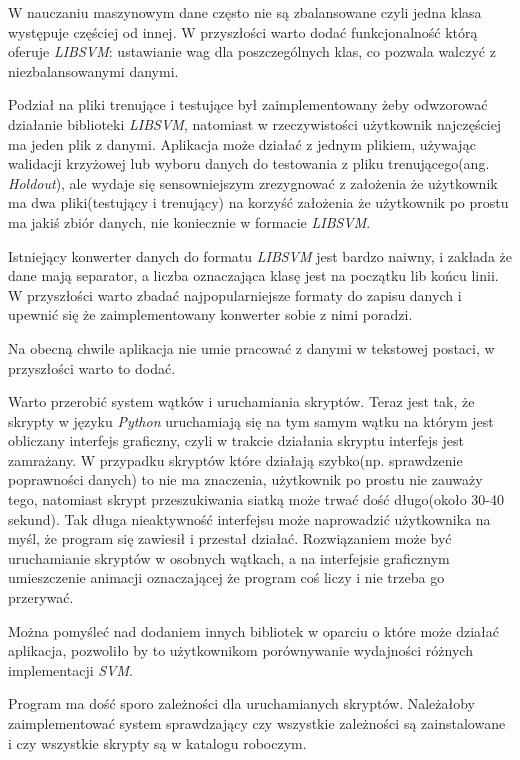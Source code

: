 \documentclass[paper=a4, fontsize=11pt]{scrartcl} %
\numberwithin{equation}{section} %
\numberwithin{figure}{section} %
\begin{document}
    \par W nauczaniu maszynowym dane często nie są zbalansowane czyli jedna klasa występuje
    częściej od innej. W przyszłości warto dodać funkcjonalność którą oferuje \textit{LIBSVM}:
    ustawianie wag dla poszczególnych klas, co pozwala walczyć z niezbalansowanymi danymi. 

    \par Podział na pliki trenujące i testujące był zaimplementowany żeby odwzorować działanie
    biblioteki \textit{LIBSVM}, natomiast w rzeczywistości użytkownik najczęściej ma jeden
    plik z danymi. Aplikacja może działać z jednym plikiem, używając walidacji krzyżowej lub
    wyboru danych do testowania z pliku trenującego(ang. \textit{Holdout}), ale wydaje się
    sensowniejszym zrezygnować z założenia że użytkownik ma dwa pliki(testujący i trenujący) na
    korzyść założenia że użytkownik po prostu ma jakiś zbiór danych, nie koniecznie w formacie
    \textit{LIBSVM}.

    \par Istniejący konwerter danych do formatu \textit{LIBSVM} jest bardzo naiwny, i zakłada
    że dane mają separator, a liczba oznaczająca klasę jest na początku lib końcu linii. W
    przyszłości warto zbadać najpopularniejsze formaty do zapisu danych i upewnić się że
    zaimplementowany konwerter sobie z nimi poradzi.

    \par Na obecną chwile aplikacja nie umie pracować z danymi w tekstowej postaci, w
    przyszłości warto to dodać. 

    \par Warto przerobić system wątków i uruchamiania skryptów. Teraz jest tak, że skrypty w
    języku \textit{Python} uruchamiają się na tym samym wątku na którym jest obliczany
    interfejs graficzny, czyli w trakcie działania skryptu interfejs jest zamrażany. W
    przypadku skryptów które działają szybko(np. sprawdzenie poprawności danych) to nie ma
    znaczenia, użytkownik po prostu nie zauważy tego, natomiast skrypt przeszukiwania siatką
    może trwać dość długo(około 30-40 sekund). Tak długa nieaktywność interfejsu może
    naprowadzić użytkownika na myśl, że program się zawiesił i przestał działać. Rozwiązaniem
    może być uruchamianie skryptów w osobnych wątkach, a na interfejsie graficznym umieszczenie
    animacji oznaczającej że program coś liczy i nie trzeba go przerywać. 
    
    \par Można pomyśleć nad dodaniem innych bibliotek w oparciu o które może działać aplikacja,
    pozwoliło by to użytkownikom porównywanie wydajności różnych implementacji \textit{SVM}.

    \par Program ma dość sporo zależności dla uruchamianych skryptów. Należałoby
    zaimplementować system sprawdzający czy wszystkie zależności są zainstalowane i czy
    wszystkie skrypty są w katalogu roboczym.
     

\newpage
\nocite{*}
\printbibliography[title={Źródła}]
\end{document}
